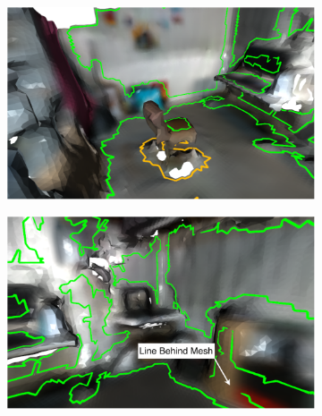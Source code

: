 \begin{figure}[!htb]
  \centering
  \begin{subfigure}[t]{.40\linewidth}
    \centering\includegraphics[clip,trim=0cm 0cm 0cm 0cm,width=.99\linewidth]{chapter_3_polylidar3d/imgs/meshes/mesh_polylidar3d_examples-mesh_basement_one.pdf}
    \caption{\label{fig:ch3_mesh_example_a}}
  \end{subfigure}
  \hfill
  \begin{subfigure}[t]{.40\linewidth}
    \centering\includegraphics[clip,trim=0cm 0cm 0cm 0cm,width=.99\linewidth]{chapter_3_polylidar3d/imgs/meshes/mesh_polylidar3d_examples-mesh_basement_two.pdf}
    \caption{\label{fig:ch3_mesh_example_b}}
  \end{subfigure}
  \par\bigskip
  \begin{subfigure}[t]{.40\linewidth}

\end{subfigure}
\end{figure}
